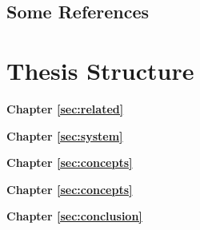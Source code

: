 \Blindtext[1][2]

\subsection{Some References}
\label{sec:intro:results:refs}
\cite{WEB:GNU:GPL:2010,WEB:Miede:2011}

\section{Thesis Structure}
\label{sec:intro:structure}

\textbf{Chapter \ref{sec:related}} \\[0.2em]
\blindtext

\textbf{Chapter \ref{sec:system}} \\[0.2em]
\blindtext

\textbf{Chapter \ref{sec:concepts}} \\[0.2em]
\blindtext

\textbf{Chapter \ref{sec:concepts}} \\[0.2em]
\blindtext

\textbf{Chapter \ref{sec:conclusion}} \\[0.2em]
\blindtext
